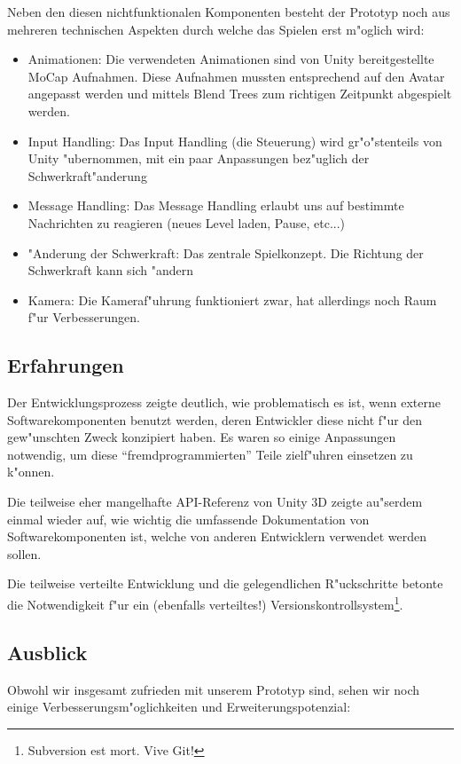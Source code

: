 Neben den diesen nichtfunktionalen Komponenten besteht der Prototyp noch aus mehreren technischen
Aspekten durch welche das Spielen erst m"oglich wird:
\begin{itemize}
	\item Animationen: Die verwendeten Animationen sind von Unity bereitgestellte MoCap Aufnahmen.
		Diese Aufnahmen mussten entsprechend auf den Avatar angepasst werden und mittels Blend Trees zum
		richtigen Zeitpunkt abgespielt werden.
	\item Input Handling: Das Input Handling (die Steuerung) wird gr"o"stenteils von Unity "ubernommen,
		mit ein paar Anpassungen bez"uglich der Schwerkraft"anderung
	\item Message Handling: Das Message Handling erlaubt uns auf bestimmte Nachrichten zu reagieren
			(neues Level laden, Pause, etc...)
	\item "Anderung der Schwerkraft: Das zentrale Spielkonzept. Die Richtung der Schwerkraft kann sich "andern
	\item Kamera: Die Kameraf"uhrung funktioniert zwar, hat allerdings noch Raum f"ur Verbesserungen.
\end{itemize}
%
\subsection{Erfahrungen}
\label{sec:results/xp}
%
Der Entwicklungsprozess zeigte deutlich, wie problematisch es
ist, wenn externe Softwarekomponenten benutzt werden, deren
Entwickler diese nicht f"ur den gew"unschten Zweck konzipiert haben.
Es waren so einige Anpassungen notwendig, um diese
``fremdprogrammierten'' Teile zielf"uhren einsetzen zu k"onnen.

Die teilweise eher mangelhafte API-Referenz von Unity 3D zeigte
au"serdem einmal wieder auf, wie wichtig die umfassende Dokumentation
von Softwarekomponenten ist, welche von anderen Entwicklern
verwendet werden sollen.

Die teilweise verteilte Entwicklung und die gelegendlichen R"uckschritte
betonte die Notwendigkeit f"ur ein (ebenfalls verteiltes!)
Versionskontrollsystem\footnote{Subversion est mort. Vive Git!}.
%
\subsection{Ausblick}
\label{sec:results/future}
%
Obwohl wir insgesamt zufrieden mit unserem Prototyp sind, sehen wir noch einige
Verbesserungsm"oglichkeiten und Erweiterungspotenzial:

